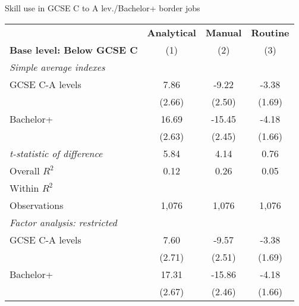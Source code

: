 \begin{center}
\begin{threeparttable}[!h]
\caption{Skill use in GCSE C to A lev./Bachelor+ border jobs}
\label{tab:skillRegs}
\begin{tabular}{lccc}
\toprule
\toprule
&\multicolumn{1}{c}{\textbf{Analytical}}&\multicolumn{1}{c}{\textbf{Manual}}&\multicolumn{1}{c}{\textbf{Routine}} \\
\textbf{Base level: Below GCSE C}&\multicolumn{1}{c}{(1)}&\multicolumn{1}{c}{(2)}&\multicolumn{1}{c}{(3)} \\
\midrule
\textit{Simple average indexes}\vspace{1mm} \\ 
\hspace{3mm}GCSE C-A levels&        7.86\sym{**} &       -9.22\sym{***}&       -3.38\sym{*}  \\
                    &      (2.66)         &      (2.50)         &      (1.69)         \\
\hspace{3mm}Bachelor+&       16.69\sym{***}&      -15.45\sym{***}&       -4.18\sym{*}  \\
                    &      (2.63)         &      (2.45)         &      (1.66)         \\
\textit{t-statistic of difference}&        5.84         &        4.14         &        0.76         \\
\midrule Overall $ R^2$&        0.12         &        0.26         &        0.05         \\
Within $ R^2$       &                     &                     &                     \\
Observations        &       1,076         &       1,076         &       1,076         \\
\midrule \vspace{1mm}\textit{Factor analysis: restricted} \\ 
\hspace{3mm}GCSE C-A levels&        7.60\sym{**} &       -9.57\sym{***}&       -3.38\sym{*}  \\
                    &      (2.71)         &      (2.51)         &      (1.69)         \\
\hspace{3mm}Bachelor+&       17.31\sym{***}&      -15.86\sym{***}&       -4.18\sym{*}  \\
                    &      (2.67)         &      (2.46)         &      (1.66)         \\

\end{tabular}
\end{threeparttable}
\end{center}
